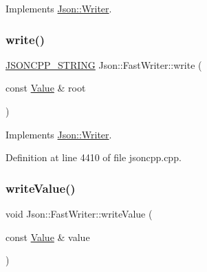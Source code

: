 Implements \hyperlink{class_json_1_1_writer_a61c55882b82c7651d0b9b683c6d3f371}{Json\+::\+Writer}.

\hypertarget{class_json_1_1_fast_writer_a93d45ba4bc312371d08beb3e3dfbe654}{}\label{class_json_1_1_fast_writer_a93d45ba4bc312371d08beb3e3dfbe654} 
\subsubsection{\texorpdfstring{write()}{write()}\hspace{0.1cm}{\footnotesize\ttfamily [2/2]}}
{\footnotesize\ttfamily \hyperlink{config_8h_a1e723f95759de062585bc4a8fd3fa4be}{J\+S\+O\+N\+C\+P\+P\+\_\+\+S\+T\+R\+I\+NG} Json\+::\+Fast\+Writer\+::write (\begin{DoxyParamCaption}\item[{const \hyperlink{class_json_1_1_value}{Value} \&}]{root }\end{DoxyParamCaption})\hspace{0.3cm}{\ttfamily [virtual]}}



Implements \hyperlink{class_json_1_1_writer_a61c55882b82c7651d0b9b683c6d3f371}{Json\+::\+Writer}.



Definition at line 4410 of file jsoncpp.\+cpp.

\hypertarget{class_json_1_1_fast_writer_a2ef4a2ce13a341171f01f414f4fdd765}{}\label{class_json_1_1_fast_writer_a2ef4a2ce13a341171f01f414f4fdd765} 
\subsubsection{\texorpdfstring{write\+Value()}{writeValue()}\hspace{0.1cm}{\footnotesize\ttfamily [1/2]}}
{\footnotesize\ttfamily void Json\+::\+Fast\+Writer\+::write\+Value (\begin{DoxyParamCaption}\item[{const \hyperlink{class_json_1_1_value}{Value} \&}]{value }\end{DoxyParamCaption})\hspace{0.3cm}{\ttfamily [private]}}

\hypertarget{class_json_1_1_fast_writer_a2ef4a2ce13a341171f01f414f4fdd765}{}\label{class_json_1_1_fast_writer_a2ef4a2ce13a341171f01f414f4fdd765} 

